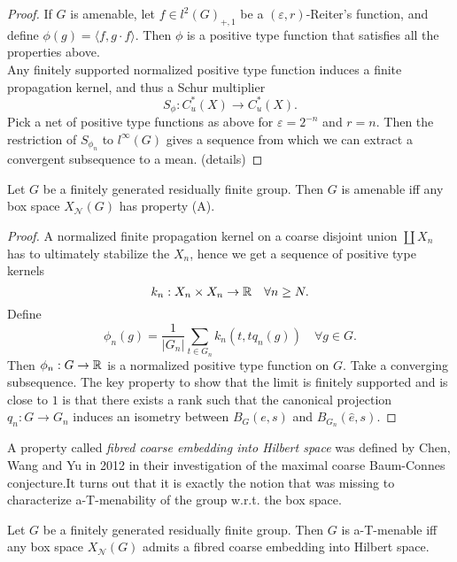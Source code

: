 \begin{proof}
If $G$ is amenable, let $f\in l^2(G)_{+,1}$ be a $(\varepsilon,r)$-Reiter's function, and define $\phi(g) = \langle f , g\cdot f\rangle$. Then $\phi$ is a positive type function that satisfies all the properties above.\\

Any finitely supported normalized positive type function induces a finite propagation kernel, and thus a Schur multiplier 
\[S_\phi : C^*_u(X) \rightarrow C^*_u(X).\]
Pick a net of positive type functions as above for $\varepsilon = 2^{-n}$ and $r=n$. Then the restriction of $S_{\phi_n}$ to $l^\infty(G)$ gives a sequence from which we can extract a convergent subsequence to a mean. (details) 
\end{proof}

\begin{thm}
Let $G$ be a finitely generated residually finite group. Then $G$ is amenable iff any box space $X_{\mathcal N}(G)$ has property (A).
\end{thm}

\begin{proof}
A normalized finite propagation kernel on a coarse disjoint union $\coprod X_n$ has to ultimately stabilize the $X_n$, hence we get a sequence of positive type kernels
\[k_n : X_n \times X_n \rightarrow \mathbb R \quad  \forall n \geq N.\]
Define 
\[\phi_n (g) =\frac{1}{|G_n|}\sum_{t\in G_n} k_n(t,tq_n(g)) \quad \forall g \in G.\]
Then $\phi_n: G\rightarrow \mathbb R$ is a normalized positive type function on $G$. Take a converging subsequence. The key property to show that the limit is finitely supported and is close to $1$ is that there exists a rank such that the canonical projection $q_n : G\rightarrow G_n$ induces an isometry between $B_G(e,s)$ and $B_{G_n}(\hat e,s)$.  
\end{proof}

A property called \textit{fibred coarse embedding into Hilbert space} was defined by Chen, Wang and Yu in 2012 in their investigation of the maximal coarse Baum-Connes conjecture.It turns out that it is exactly the notion that was missing to characterize a-T-menability of the group w.r.t. the box space.

\begin{thm}
Let $G$ be a finitely generated residually finite group. Then $G$ is a-T-menable iff any box space $X_{\mathcal N}(G)$ admits a fibred coarse embedding into Hilbert space.
\end{thm}  

